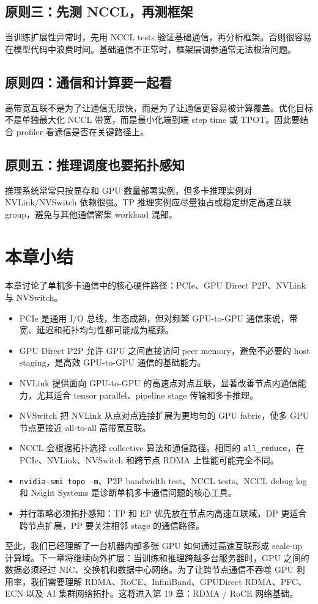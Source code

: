 \subsection{原则三：先测 NCCL，再测框架}
\label{subsec:principle-test-nccl-first}

当训练扩展性异常时，先用 NCCL tests 验证基础通信，再分析框架。否则很容易在模型代码中浪费时间。基础通信不正常时，框架层调参通常无法根治问题。

\subsection{原则四：通信和计算要一起看}
\label{subsec:principle-comm-compute}

高带宽互联不是为了让通信无限快，而是为了让通信更容易被计算覆盖。优化目标不是单独最大化 NCCL 带宽，而是最小化端到端 step time 或 TPOT。因此要结合 profiler 看通信是否在关键路径上。

\subsection{原则五：推理调度也要拓扑感知}
\label{subsec:principle-serving-topology}

推理系统常常只按显存和 GPU 数量部署实例，但多卡推理实例对 NVLink/NVSwitch 依赖很强。TP 推理实例应尽量独占或稳定绑定高速互联 group，避免与其他通信密集 workload 混部。

\section{本章小结}
\label{sec:nvlink-nvswitch-summary}

本章讨论了单机多卡通信中的核心硬件路径：PCIe、GPU Direct P2P、NVLink 与 NVSwitch。

\begin{itemize}
  \item PCIe 是通用 I/O 总线，生态成熟，但对频繁 GPU-to-GPU 通信来说，带宽、延迟和拓扑均匀性都可能成为瓶颈。
  \item GPU Direct P2P 允许 GPU 之间直接访问 peer memory，避免不必要的 host staging，是高效 GPU-to-GPU 通信的基础能力。
  \item NVLink 提供面向 GPU-to-GPU 的高速点对点互联，显著改善节点内通信能力，尤其适合 tensor parallel、pipeline stage 传输和多卡推理。
  \item NVSwitch 把 NVLink 从点对点连接扩展为更均匀的 GPU fabric，使多 GPU 节点更接近 all-to-all 高带宽互联。
  \item NCCL 会根据拓扑选择 collective 算法和通信路径。相同的 \texttt{all\_reduce}，在 PCIe、NVLink、NVSwitch 和跨节点 RDMA 上性能可能完全不同。
  \item \texttt{nvidia-smi topo -m}、P2P bandwidth test、NCCL tests、NCCL debug log 和 Nsight Systems 是诊断单机多卡通信问题的核心工具。
  \item 并行策略必须拓扑感知：TP 和 EP 优先放在节点内高速互联域，DP 更适合跨节点扩展，PP 要关注相邻 stage 的通信路径。
\end{itemize}

至此，我们已经理解了一台机器内部多张 GPU 如何通过高速互联形成 scale-up 计算域。下一章将继续向外扩展：当训练和推理跨越多台服务器时，GPU 之间的数据必须经过 NIC、交换机和数据中心网络。为了让跨节点通信不吞噬 GPU 利用率，我们需要理解 RDMA、RoCE、InfiniBand、GPUDirect RDMA、PFC、ECN 以及 AI 集群网络拓扑。这将进入第 19 章：RDMA / RoCE 网络基础。
